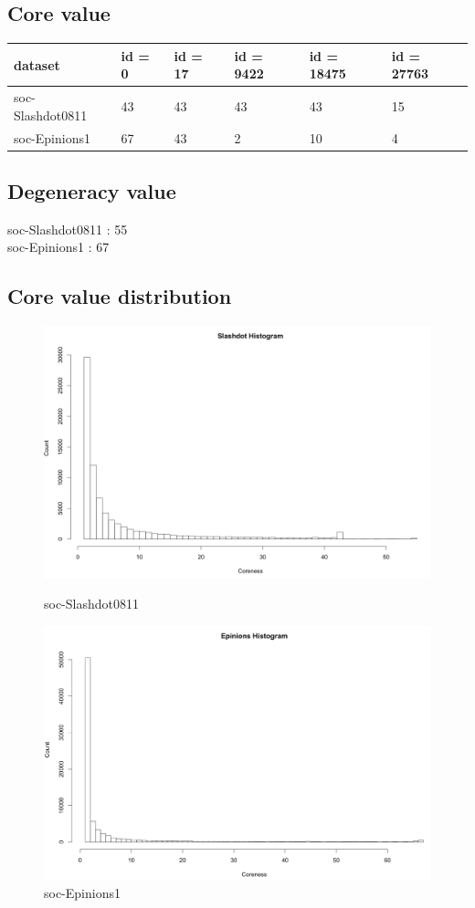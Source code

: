 \subsection{Core value}
\begin{table}[!ht]
	\begin{tabular}{| l | l | l | l | l | l |}
	  \hline			
	  dataset & id = 0 & id = 17 & id = 9422 & id = 18475 & id = 27763 \\ \hline
	  soc-Slashdot0811 & 43 & 43 & 43 & 43 & 15\\ \hline
	  soc-Epinions1 & 67 & 43 & 2 & 10 & 4 \\
	  \hline  
	\end{tabular}
	\label{tab:a}
\end{table}

\subsection{Degeneracy value}
soc-Slashdot0811 : 55\\
soc-Epinions1 : 67\\


\subsection{Core value distribution}
\begin{figure}[H]
  \includegraphics[width=\linewidth]{hist1}
  \caption{soc-Slashdot0811}
\endminipage\hfill
{}
  \includegraphics[width=\linewidth]{hist2}
  \caption{soc-Epinions1}
\endminipage
\end{figure}